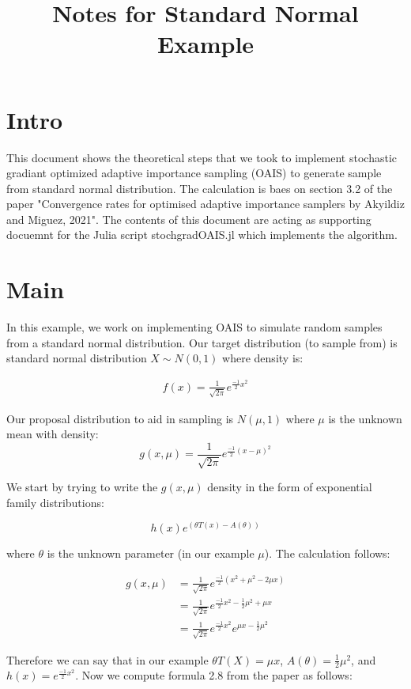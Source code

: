\documentclass{article}
\title{Notes for Standard Normal Example}
\begin{document}
\maketitle

\section{Intro}
This document shows the theoretical steps that we took to implement stochastic gradiant optimized adaptive importance sampling (OAIS) to generate sample from standard normal distribution. The calculation is baes on section 3.2 of the paper "Convergence rates for optimised adaptive importance samplers by Akyildiz and Miguez, 2021". The contents of this document are acting as supporting docuemnt for the Julia script stochgradOAIS.jl which implements the algorithm.

\section{Main}
In this example, we work on implementing OAIS to simulate random samples from a standard normal
distribution. Our target distribution (to sample from) is standard normal distribution $X \sim N(0,1)$ where density is:

\begin{align*}
f(x) = \frac{1}{\sqrt{2\pi}} e^{\frac{-1}{2} x^2}    
\end{align*}

Our proposal distribution to aid in sampling is $N(\mu,1)$ where $\mu$ is the unknown mean with density:
$$
g(x,\mu) = \frac{1}{\sqrt{2\pi}} e^{\frac{-1}{2} (x-\mu)^2}
$$

We start by trying to write the $g(x,\mu)$ density in the form of exponential family distributions:

$$h(x) e^{(\theta T(x) - A(\theta))}$$

where $\theta$ is the unknown parameter (in our example $\mu$). The calculation follows:

\begin{align*}
    g(x,\mu) &= \frac{1}{\sqrt{2\pi}} e^{ \frac{-1}{2} (x^2 + \mu^2 - 2 \mu x) } \\
             &= \frac{1}{\sqrt{2\pi}} e^{ \frac{-1}{2} x^2 - \frac{1}{2} \mu^2 + \mu x } \\
             &= \frac{1}{\sqrt{2\pi}} e^{\frac{-1}{2}x^2} e^{\mu x - \frac{1}{2} \mu^2}
\end{align*}

Therefore we can say that in our example $\theta T(X) = \mu x$, $A(\theta) = \frac{1}{2} \mu^2$, and $h(x) = e^{\frac{-1}{2}x^2}$. Now we compute formula 2.8 from the paper as follows:
\end{document}
